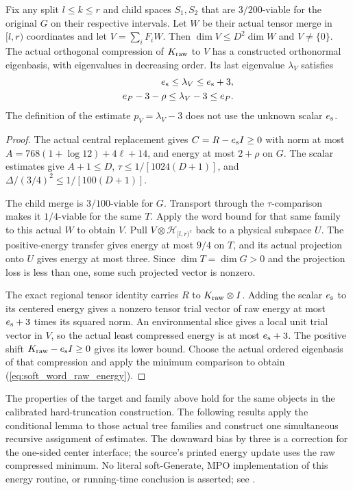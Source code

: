 \begin{lemma}
    Fix any split $l\le k\le r$ and child spaces $S_1,S_2$ that are
    $3/200$-viable for the original $G$ on their respective intervals.
    Let $W$ be their actual tensor merge in $[l,r)$ coordinates and
    let $V=\sum_iF_iW$. Then $\dim V\le D^2\dim W$ and $V\ne\{0\}$.
    The actual orthogonal compression of $K_{\rm raw}$ to $V$ has a
    constructed orthonormal eigenbasis, with eigenvalues in decreasing
    order. Its last eigenvalue $\lambda_V$ satisfies
    \begin{align}
        e_{\rm s}\le\lambda_V\le e_{\rm s}+3, \\
        e_P-3-\rho\le\lambda_V-3\le e_P.
        \label{eq:soft_word_raw_energy}
    \end{align}
    The definition of the estimate $p_V=\lambda_V-3$ does not use the
    unknown scalar $e_{\rm s}$.
\end{lemma}
\begin{proof}\leanok
    The actual central replacement gives $C=R-e_{\rm s}I\ge0$ with
    norm at most $A=768(1+\log12)+4\ell+14$, and energy at most
    $2+\rho$ on $G$. The scalar estimates give $A+1\le D$,
    $\tau\le1/[1024(D+1)]$, and
    $\Delta/(3/4)^2\le1/[100(D+1)]$.

    The child merge is $3/100$-viable for $G$. Transport through the
    $\tau$-comparison makes it $1/4$-viable for the same $T$.
    Apply the word bound for that same family to this actual $W$ to obtain
    $V$. Pull $V\otimes\mathcal H_{[l,r)^c}$ back to a physical
    subspace $U$. The positive-energy transfer gives energy at most
    $9/4$ on $T$, and its actual projection onto $U$ gives energy
    at most three. Since $\dim T=\dim G>0$ and the projection loss
    is less than one, some such projected vector is nonzero.

    The exact regional tensor identity carries $R$ to
    $K_{\rm raw}\otimes I$. Adding the scalar $e_{\rm s}$ to its
    centered energy gives a nonzero tensor trial vector of raw energy
    at most $e_{\rm s}+3$ times its squared norm. An environmental
    slice gives a local unit trial vector in $V$, so the actual least
    compressed energy is at most $e_{\rm s}+3$. The positive shift
    $K_{\rm raw}-e_{\rm s}I\ge0$ gives its lower bound. Choose the
    actual ordered eigenbasis of that compression and apply the
    minimum comparison to obtain (\ref{eq:soft_word_raw_energy}).
\end{proof}

The properties of the target and family above hold for the same objects
in the calibrated hard-truncation construction. The following results apply the conditional lemma to those actual tree
families and construct one simultaneous recursive assignment of estimates. The downward bias by three is a
correction for the one-sided center interface; the source's printed
energy update uses the raw compressed minimum. No literal soft-Generate,
MPO implementation of this energy routine, or running-time conclusion
is asserted; see \cite{gap:alvv16_soft_regional_energy_centering}.


